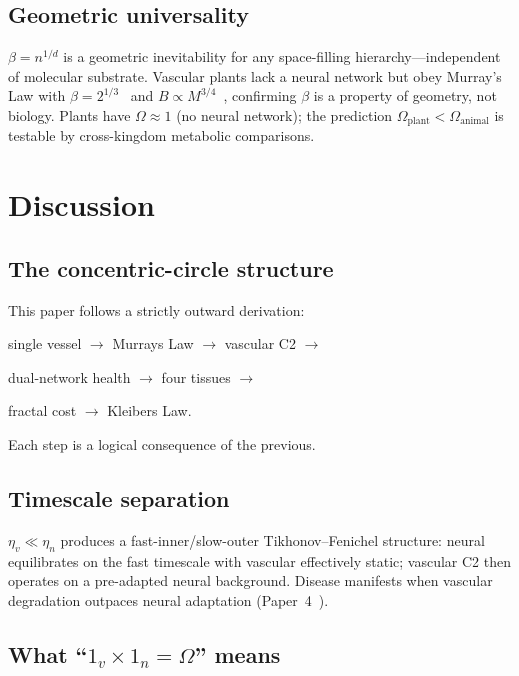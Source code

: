 \documentclass[aps,pre,twocolumn,superscriptaddress,floatfix]{revtex4-2}
\begin{document}
\subsection{Geometric universality}

$\beta = n^{1/d}$ is a geometric inevitability for any
space-filling hierarchy---independent of molecular
substrate.
Vascular plants lack a neural network but obey Murray's
Law with $\beta = 2^{1/3}$~\cite{McCulloh2003} and
$B \propto M^{3/4}$~\cite{Niklas1994}, confirming
$\beta$ is a property of geometry, not biology.
Plants have $\Omega \approx 1$ (no neural network);
the prediction
$\Omega_{\text{plant}} < \Omega_{\text{animal}}$
is testable by cross-kingdom metabolic comparisons.





\section{Discussion}
\label{sec:discussion}

\subsection{The concentric-circle structure}

This paper follows a strictly outward derivation:

single vessel $\to$ Murrays Law $\to$ vascular C2 $\to$

dual-network health $\to$ four tissues $\to$

fractal cost $\to$ Kleibers Law.

Each step is a logical consequence of the previous.

\subsection{Timescale separation}

$\eta_v \ll \eta_n$ produces a fast-inner/slow-outer
Tikhonov--Fenichel structure:
neural equilibrates on the fast timescale with
vascular effectively static;
vascular C2 then operates on a pre-adapted neural
background.
Disease manifests when vascular degradation outpaces
neural adaptation (Paper~4~\cite{Paper4}).

\subsection{What ``$1_v \times 1_n = \Omega$'' means}
\end{document}
